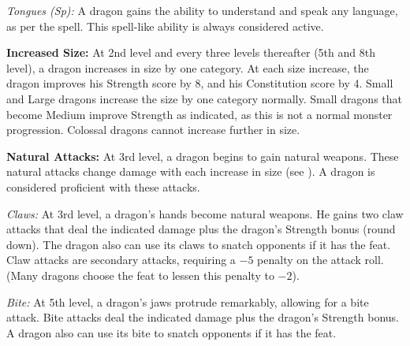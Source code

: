 {\textit{Tongues (Sp):} A dragon gains the ability to understand and speak any language, as per the  spell. This spell-like ability is always considered active.

\textbf{Increased Size:} At 2nd level and every three levels thereafter (5th and 8th level), a dragon increases in size by one category. At each size increase, the dragon improves his Strength score by 8, and his Constitution score by 4. Small and Large dragons increase the size by one category normally. Small dragons that become Medium improve Strength as indicated, as this is not a normal monster progression. Colossal dragons cannot increase further in size.

\textbf{Natural Attacks:} At 3rd level, a dragon begins to gain natural weapons. These natural attacks change damage with each increase in size (see ). A dragon is considered proficient with these attacks.


\textit{Claws:} At 3rd level, a dragon's hands become natural weapons. He gains two claw attacks that deal the indicated damage plus \onehalf the dragon's Strength bonus (round down). The dragon also can use its claws to snatch opponents if it has the  feat. Claw attacks are secondary attacks, requiring a $-5$ penalty on the attack roll. (Many dragons choose the  feat to lessen this penalty to $-2$).

\textit{Bite:} At 5th level, a dragon's jaws protrude remarkably, allowing for a bite attack. Bite attacks deal the indicated damage plus the dragon's Strength bonus. A dragon also can use its bite to snatch opponents if it has the  feat.

}
